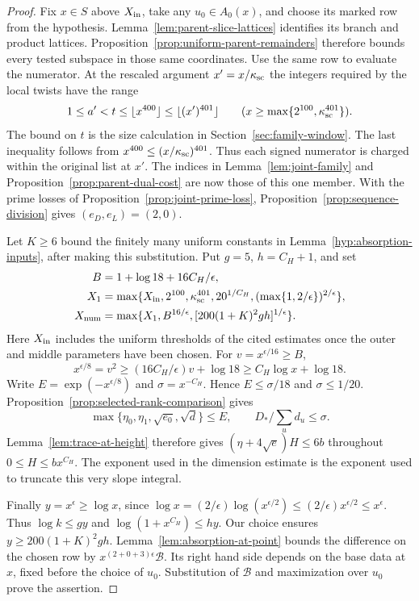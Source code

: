 \begin{proof}
Fix \(x\in S\) above \(X_{\rm in}\), take any \(u_0\in A_0(x)\),
and choose its marked row from the hypothesis. Lemma~\ref{lem:parent-slice-lattices}
identifies its branch and product lattices. Proposition~\ref{prop:uniform-parent-remainders}
therefore bounds every tested subspace in those same coordinates.
Use the same row to evaluate the numerator. At the rescaled argument
\(x'=x/\kappa_{\rm sc}\) the integers required by the local twists
have the range
\[
     1\le a'<t\le\lfloor x^{400}\rfloor
                 \le\lfloor(x')^{401}\rfloor
           \qquad(x\ge\max\{2^{100},\kappa_{\rm sc}^{401}\}).
\]
The bound on \(t\) is the size calculation in
Section~\ref{sec:family-window}. The last inequality follows from
\(x^{400}\le(x/\kappa_{\rm sc})^{401}\). Thus each signed numerator is
charged within the original list at \(x'\). The indices in
Lemma~\ref{lem:joint-family} and Proposition~\ref{prop:parent-dual-cost}
are now those of this one member. With the prime losses of
Proposition~\ref{prop:joint-prime-loss}, Proposition~\ref{prop:sequence-division}
gives \((e_D,e_L)=(2,0)\).

Let \(K\ge6\) bound the finitely many uniform constants in
Lemma~\ref{hyp:absorption-inputs}, after making this substitution.
Put \(g=5\), \(h=C_H+1\), and set
\begin{align*}
 B&=1+\log18+16C_H/\epsilon,\\
 X_1&=\max\{X_{\rm in},2^{100},\kappa_{\rm sc}^{401},
             20^{1/C_H},(\max\{1,2/\epsilon\})^{2/\epsilon}\},\\
 X_{\rm num}&=\max\{X_1,B^{16/\epsilon},
                        [200(1+K)^2gh]^{1/\epsilon}\}.
\end{align*}
Here \(X_{\rm in}\) includes the uniform thresholds of the cited
estimates once the outer and middle parameters have been chosen.
For \(v=x^{\epsilon/16}\ge B\),
\[
 x^{\epsilon/8}=v^2\ge(16 C_H/\epsilon)v+\log18
       \ge C_H\log x+\log18 .
\]
Write \(E=\exp(-x^{\epsilon/8})\) and \(\sigma=x^{-C_H}\). Hence
\(E\le\sigma/18\) and \(\sigma\le1/20\).
Proposition~\ref{prop:selected-rank-comparison} gives
\[
 \max\{\eta_0,\eta_1,\sqrt{e_0},\sqrt d\}\le E,\qquad
             D_*/\sum_u d_u\le\sigma .
\]
Lemma~\ref{lem:trace-at-height} therefore gives
\((\eta+4\sqrt e)H\le6b\) throughout \(0\le H\le bx^{C_H}\).
The exponent used in the dimension estimate is the exponent used
to truncate this very slope integral.

Finally \(y=x^\epsilon\ge\log x\), since
\(\log x=(2/\epsilon)\log(x^{\epsilon/2})\le
(2/\epsilon)x^{\epsilon/2}\le x^\epsilon\).
Thus \(\log k\le gy\) and \(\log(1+x^{C_H})\le hy\). Our choice
ensures \(y\ge200(1+K)^2gh\). Lemma~\ref{lem:absorption-at-point}
bounds the difference on the chosen row by
\(x^{(2+0+3)\epsilon}\mathcal B\). Its right hand side depends
on the base data at \(x\), fixed before the choice of \(u_0\).
Substitution of \(\mathcal B\) and maximization over \(u_0\) prove
the assertion.
\end{proof}

